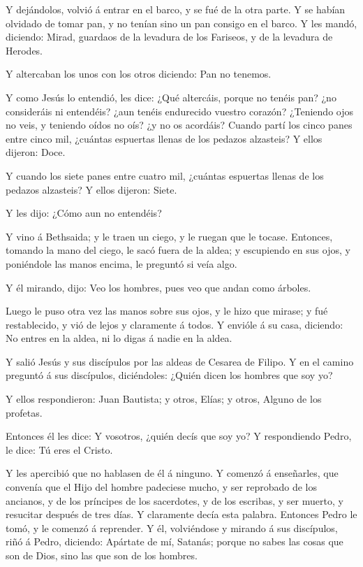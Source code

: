  Y dejándolos, volvió á entrar en el barco, y se fué de la
otra parte.  Y se habían olvidado de tomar pan, y no tenían
sino un pan consigo en el barco.  Y les mandó, diciendo:
Mirad, guardaos de la levadura de los Fariseos, y de la levadura de
Herodes.

 Y altercaban los unos con los otros diciendo: Pan no
tenemos.

 Y como Jesús lo entendió, les dice: ¿Qué altercáis, porque
no tenéis pan? ¿no consideráis ni entendéis? ¿aun tenéis endurecido
vuestro corazón?  ¿Teniendo ojos no veis, y teniendo oídos
no oís? ¿y no os acordáis?  Cuando partí los cinco panes
entre cinco mil, ¿cuántas espuertas llenas de los pedazos alzasteis? Y
ellos dijeron: Doce.

 Y cuando los siete panes entre cuatro mil, ¿cuántas
espuertas llenas de los pedazos alzasteis? Y ellos dijeron: Siete.

 Y les dijo: ¿Cómo aun no entendéis?

 Y vino á Bethsaida; y le traen un ciego, y le ruegan que
le tocase.  Entonces, tomando la mano del ciego, le sacó
fuera de la aldea; y escupiendo en sus ojos, y poniéndole las manos
encima, le preguntó si veía algo.

 Y él mirando, dijo: Veo los hombres, pues veo que andan
como árboles.

 Luego le puso otra vez las manos sobre sus ojos, y le hizo
que mirase; y fué restablecido, y vió de lejos y claramente á todos.
 Y envióle á su casa, diciendo: No entres en la aldea, ni
lo digas á nadie en la aldea.

 Y salió Jesús y sus discípulos por las aldeas de Cesarea
de Filipo. Y en el camino preguntó á sus discípulos, diciéndoles: ¿Quién
dicen los hombres que soy yo?

 Y ellos respondieron: Juan Bautista; y otros, Elías; y
otros, Alguno de los profetas.

 Entonces él les dice: Y vosotros, ¿quién decís que soy yo?
Y respondiendo Pedro, le dice: Tú eres el Cristo.

 Y les apercibió que no hablasen de él á ninguno.
 Y comenzó á enseñarles, que convenía que el Hijo del
hombre padeciese mucho, y ser reprobado de los ancianos, y de los
príncipes de los sacerdotes, y de los escribas, y ser muerto, y
resucitar después de tres días.  Y claramente decía esta
palabra. Entonces Pedro le tomó, y le comenzó á reprender. 
Y él, volviéndose y mirando á sus discípulos, riñó á Pedro, diciendo:
Apártate de mí, Satanás; porque no sabes las cosas que son de Dios, sino
las que son de los hombres.


